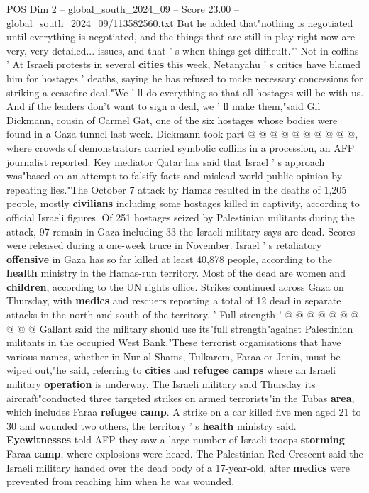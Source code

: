\begin{textsample}{POS Dim 2 – global\_south\_2024\_09 – Score 23.00 – global\_south\_2024\_09/113582560.txt}
But he added that"nothing is negotiated until everything is negotiated, and the things that are still in play right now are very, very detailed... issues, and that ' s when things get difficult."' Not in coffins ' At Israeli protests in several \textbf{cities} this week, Netanyahu ' s critics have blamed him for hostages ' deaths, saying he has refused to make necessary concessions for striking a ceasefire deal."We ' ll do everything so that all hostages will be with us.
And if the leaders don't want to sign a deal, we ' ll make them,"said Gil Dickmann, cousin of Carmel Gat, one of the six hostages whose bodies were found in a Gaza tunnel last week.
Dickmann took part @ @ @ @ @ @ @ @ @ @, where crowds of demonstrators carried symbolic coffins in a procession, an AFP journalist reported.
Key mediator Qatar has said that Israel ' s approach was"based on an attempt to falsify facts and mislead world public opinion by repeating lies."The October 7 attack by Hamas resulted in the deaths of 1,205 people, mostly \textbf{civilians} including some hostages killed in captivity, according to official Israeli figures.
Of 251 hostages seized by Palestinian militants during the attack, 97 remain in Gaza including 33 the Israeli military says are dead.
Scores were released during a one-week truce in November.
Israel ' s retaliatory \textbf{offensive} in Gaza has so far killed at least 40,878 people, according to the \textbf{health} ministry in the Hamas-run territory.
Most of the dead are women and \textbf{children}, according to the UN rights office.
Strikes continued across Gaza on Thursday, with \textbf{medics} and rescuers reporting a total of 12 dead in separate attacks in the north and south of the territory. ' Full strength ' @ @ @ @ @ @ @ @ @ @ Gallant said the military should use its"full strength"against Palestinian militants in the occupied West Bank."These terrorist organisations that have various names, whether in Nur al-Shams, Tulkarem, Faraa or Jenin, must be wiped out,"he said, referring to \textbf{cities} and \textbf{refugee} \textbf{camps} where an Israeli military \textbf{operation} is underway.
The Israeli military said Thursday its aircraft"conducted three targeted strikes on armed terrorists"in the Tubas \textbf{area}, which includes Faraa \textbf{refugee} \textbf{camp}.
A strike on a car killed five men aged 21 to 30 and wounded two others, the territory ' s \textbf{health} ministry said. \textbf{Eyewitnesses} told AFP they saw a large number of Israeli troops \textbf{storming} Faraa \textbf{camp}, where explosions were heard.
The Palestinian Red Crescent said the Israeli military handed over the dead body of a 17-year-old, after \textbf{medics} were prevented from reaching him when he was wounded.

\end{textsample}
